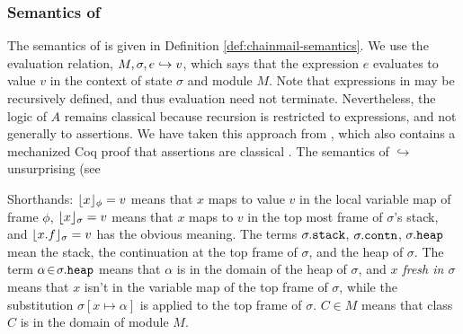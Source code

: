 \subsubsection{Semantics of \SpecO}
The semantics of \SpecO   
is given in Definition \ref{def:chainmail-semantics}. 
We   use the evaluation relation, $M, \sigma, e \hookrightarrow v$,
which says that the expression $e$ evaluates
to value $v$ in the context of state $\sigma$ and module $M$.
Note that expressions in \Loo may be recursively defined, and thus evaluation 
need not  %
 terminate. Nevertheless, the logic of $A$ remains classical because recursion is restricted
to expressions, and not generally to assertions.
We have taken this approach from , which also contains a mechanized Coq proof that assertions are classical \cite{coqFASE}.
The semantics of $\hookrightarrow$  unsurprising 
(see  %

Shorthands: 
 $\lfloor x \rfloor_{\phi} = v$  means that $x$ maps to
value $v$ in the local variable map of frame $\phi$, $\lfloor x \rfloor_{\sigma} = v$ means that $x$ 
maps to $v$ in the top most frame of $\sigma$'s stack, and $\lfloor x.f \rfloor_{\sigma} = v$
has the obvious meaning. The terms $\sigma.{\texttt{stack}}$,  
$\sigma.{\texttt{contn}}$, 
$\sigma.{\texttt{heap}}$     mean the stack, 
the continuation at the
top frame of $\sigma$, %
and the heap of $\sigma$.
The term $\alpha\!\in\!\sigma.{\texttt{heap}}$ means that $\alpha$ is in the domain of the heap of $\sigma$, and \emph{$x$ fresh in $\sigma$} means that 
$x$ isn't in the variable map of the top frame of $\sigma$, 
while the substitution  $\sigma[x \mapsto \alpha]$ is applied to the top frame of $\sigma$.
$C\in M$ means that class $C$ is in the domain of module $M$. 

